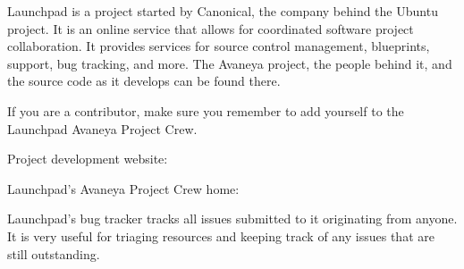 

Launchpad is a project started by Canonical, the company behind the Ubuntu project. It is an online service that allows for coordinated software project collaboration. It provides services for source control management, blueprints, support, bug tracking, and more. The Avaneya project, the people behind it, and the source code as it develops can be found there.

If you are a contributor, make sure you remember to add yourself to the Launchpad Avaneya Project Crew.

\blank[2*big]
\startnarrower[3*left]
Project development website:\crlf
{}

\blank[2*big]
Launchpad's Avaneya Project Crew home:\crlf
{}
\stopnarrower

Launchpad's bug tracker tracks all issues submitted to it originating from anyone. It is very useful for triaging resources and keeping track of any issues that are still outstanding.

\startnarrower[3*left]
\stopnarrower

